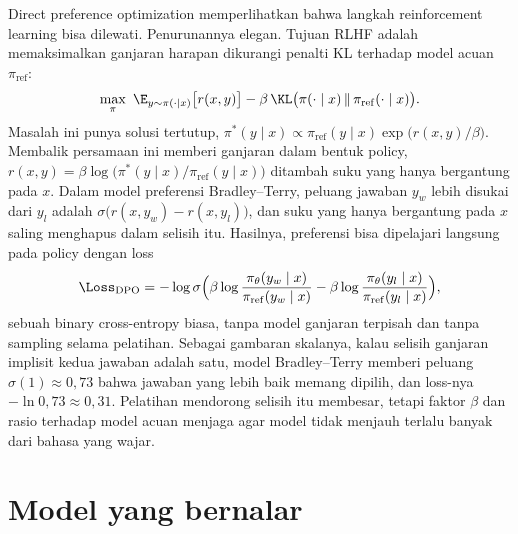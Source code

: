 Direct preference optimization \citep{rafailov2023} memperlihatkan bahwa langkah reinforcement learning
bisa dilewati. Penurunannya elegan. Tujuan RLHF adalah memaksimalkan ganjaran harapan dikurangi penalti
KL terhadap model acuan $\pi_{\mathrm{ref}}$:
\begin{equation}
\max_\pi\ \E_{y\sim\pi(\cdot\mid x)}\big[r(x,y)\big]-\beta\,\KL\big(\pi(\cdot\mid x)\,\|\,\pi_{\mathrm{ref}}(\cdot\mid x)\big).
\end{equation}
Masalah ini punya solusi tertutup, $\pi^*(y\mid x)\propto\pi_{\mathrm{ref}}(y\mid x)\exp\big(r(x,y)/\beta\big)$.
Membalik persamaan ini memberi ganjaran dalam bentuk policy, $r(x,y)=\beta\log\big(\pi^*(y\mid x)/\pi_{\mathrm{ref}}(y\mid x)\big)$
ditambah suku yang hanya bergantung pada $x$. Dalam model preferensi Bradley--Terry, peluang jawaban $y_w$
lebih disukai dari $y_l$ adalah $\sigma\big(r(x,y_w)-r(x,y_l)\big)$, dan suku yang hanya bergantung pada $x$
saling menghapus dalam selisih itu. Hasilnya, preferensi bisa dipelajari langsung pada policy dengan loss
\begin{equation}
\Loss_{\mathrm{DPO}}=-\log\sigma\Big(\beta\log\frac{\pi_\theta(y_w\mid x)}{\pi_{\mathrm{ref}}(y_w\mid x)}-\beta\log\frac{\pi_\theta(y_l\mid x)}{\pi_{\mathrm{ref}}(y_l\mid x)}\Big),
\end{equation}
sebuah binary cross-entropy biasa, tanpa model ganjaran terpisah dan tanpa sampling selama pelatihan.
Sebagai gambaran skalanya, kalau selisih ganjaran implisit kedua jawaban adalah satu, model Bradley--Terry memberi
peluang $\sigma(1)\approx0{,}73$ bahwa jawaban yang lebih baik memang dipilih, dan loss-nya $-\ln0{,}73\approx0{,}31$.
Pelatihan mendorong selisih itu membesar, tetapi faktor $\beta$ dan rasio terhadap model acuan menjaga agar model tidak
menjauh terlalu banyak dari bahasa yang wajar.

\section{Model yang bernalar}

